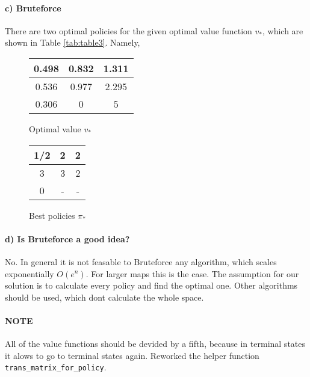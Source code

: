 \documentclass{article}
\begin{document}
\paragraph*{c) Bruteforce}

There are two optimal policies for the given optimal value function $v_*$, which are shown in Table \ref{tab:table3}. Namely, 

\begin{figure}[H]
\begin{minipage}{0.45\textwidth}
    \centering
    \begin{tabular}{c|c|c}
    0.498 & 0.832 & 1.311 \\ \hline
    0.536 & 0.977 & 2.295 \\ \hline                 
    0.306 & 0 & 5 \\
    \end{tabular}
    \caption{Optimal value $v_*$}
    \label{tab:table3}
\end{minipage}
\begin{minipage}{0.45\textwidth}
    \centering
    \begin{tabular}{c|c|c}
     1/2 & 2 & 2 \\ \hline
     3 & 3 & 2 \\ \hline
     0 & - & -
    \end{tabular}
    \caption{Best policies $\pi_*$}
    \label{tab:bestPol}
\end{minipage}    
\end{figure}






\paragraph*{d) Is Bruteforce a good idea?}

No. In general it is not feasable to Bruteforce any algorithm, which scales exponentially $O(e^n)$. For larger maps this is the case. The assumption for our solution is to calculate every policy and find the optimal one. Other algorithms should be used, which dont calculate the whole space. 

\paragraph*{NOTE}
All of the value functions should be devided by a fifth, because in terminal states it alows to go to terminal states again. Reworked the helper function \texttt{trans_matrix_for_policy}.
\end{document}
